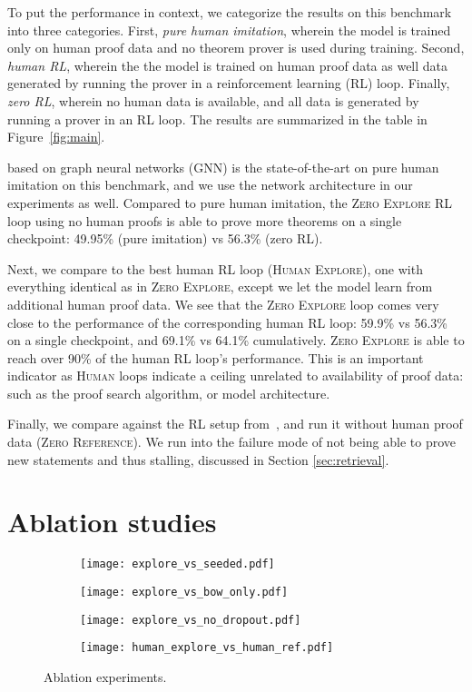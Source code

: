\documentclass{article}
\begin{document}
To put the performance in context, we categorize the results on this benchmark into three categories. First, \emph{pure human imitation}, wherein the model is trained only on human proof data and no theorem prover is used during training.
Second, \emph{human RL}, wherein the the model is trained
on human proof data as well data generated by running
the prover in a reinforcement learning (RL) loop.
Finally, \emph{zero RL}, wherein no human data is available, and all data is generated by running a prover in an RL loop.
The results are summarized in the table in Figure~\ref{fig:main}.

\citet{paliwal2020graph} based on graph neural networks (GNN) is the state-of-the-art on pure human imitation on this benchmark,
and we use the network architecture in our experiments as well.
Compared to pure human imitation, the \textsc{Zero Explore} RL loop using no human proofs is able to prove more theorems on a single checkpoint: 49.95\% (pure imitation) vs 56.3\% (zero RL).

Next, we compare to the best human RL loop (\textsc{Human Explore}), one with everything identical as in \textsc{Zero Explore}, except we let the model learn from additional human proof data.
We see that the \textsc{Zero Explore} loop comes very close to the performance of the corresponding human RL loop: 59.9\% vs 56.3\% on a single checkpoint, and 69.1\% vs 64.1\% cumulatively.
\textsc{Zero Explore} is able to reach over 90\% of the human RL loop's performance.
This is an important indicator as \textsc{Human} loops indicate a ceiling unrelated to availability of proof data: such as the proof search algorithm, or model architecture.

Finally, we compare against the RL setup from~\citet{bansal2019holist}, and run it without human proof data (\textsc{Zero Reference}). We run into the failure mode of not being able to prove new statements and thus stalling, discussed in Section \ref{sec:retrieval}.
\section{Ablation studies}
\begin{figure}
    \centering
    \begin{subfigure}[b]{0.5\textwidth}
        \texttt{[image: explore\_vs\_seeded.pdf]}
    \end{subfigure}
    \begin{subfigure}[b]{0.49\textwidth}
        \texttt{[image: explore\_vs\_bow\_only.pdf]}
    \end{subfigure}
    \begin{subfigure}[b]{0.5\textwidth}
        \texttt{[image: explore\_vs\_no\_dropout.pdf]}
    \end{subfigure}
    \begin{subfigure}[b]{0.49\textwidth}
        \texttt{[image: human\_explore\_vs\_human\_ref.pdf]}
    \end{subfigure}
\caption{Ablation experiments.
}
\label{fig:ablation}
\vspace{-4mm}
\end{figure}
\end{document}
